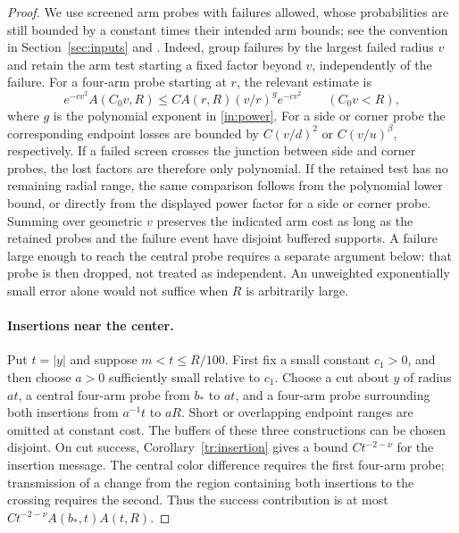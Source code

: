 \begin{proof}
We use screened arm probes with failures allowed, whose probabilities
are still bounded by a constant times their intended arm bounds;
see the convention in Section~\ref{sec:inputs} and
\cite[Section~2, ``Buffered localization'']{V}.
Indeed, group failures by the largest failed radius $v$ and retain
the arm test starting a fixed factor beyond $v$, independently of
the failure. For a four-arm probe starting at $r$, the relevant
estimate is
\[
 e^{-cv^2}A(C_0v,R)
 \le C A(r,R)(v/r)^g e^{-cv^2}
 \qquad(C_0v<R),
\]
where $g$ is the polynomial exponent in \eqref{in:power}.
For a side or corner probe the corresponding endpoint losses
are bounded by $C(v/d)^2$ or $C(v/u)^\beta$, respectively.
If a failed screen crosses the junction between side and corner
probes, the lost factors are therefore only polynomial. If the
retained test has no remaining radial range, the same comparison follows from the
polynomial lower bound, or directly from the displayed power
factor for a side or corner probe. Summing over geometric $v$
preserves the indicated arm cost as long as the retained probes
and the failure event have disjoint buffered supports. A failure
large enough to reach the central probe requires a separate
argument below: that probe is then dropped, not treated as
independent. An unweighted exponentially small error alone would
not suffice when $R$ is arbitrarily large.

\paragraph{Insertions near the center.}
Put $t=|y|$ and suppose $m<t\le R/100$. First fix a small
constant $c_1>0$, and then choose $a>0$ sufficiently small relative
to $c_1$. Choose a cut about $y$ of radius $a t$,
a central four-arm probe from $b_*$ to $a t$,
and a four-arm probe surrounding both insertions from $a^{-1}t$
to $aR$.
Short or overlapping endpoint ranges are omitted at constant cost.
The buffers of these three constructions can be chosen disjoint.
On cut success, Corollary~\ref{tr:insertion} gives a bound
$Ct^{-2-\nu}$ for the insertion message. The central color
difference requires the first four-arm probe; transmission of a
change from the region containing both insertions to the crossing
requires the second. Thus the success contribution is at most
$Ct^{-2-\nu}A(b_*,t)A(t,R)$.


\end{proof}
